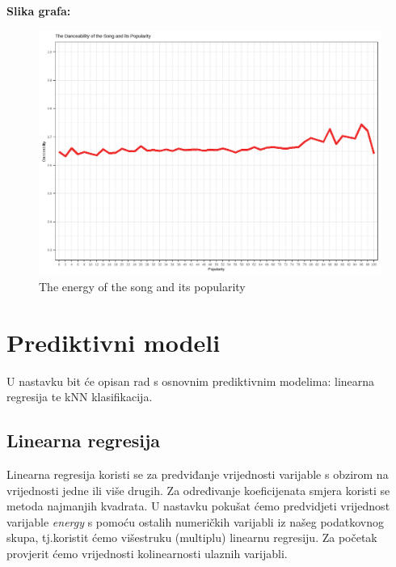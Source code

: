     
    \textbf{Slika grafa:}
    \begin{figure}[H]
    	\includegraphics[scale=0.9]{slike/danceability_popularity.png}
    	\centering
    	\caption{The energy of the song and its popularity}
    	
    \end{figure}
    
    

\clearpage
\section{Prediktivni modeli}

	U nastavku bit će opisan rad s osnovnim prediktivnim modelima: linearna regresija te kNN klasifikacija. 
	
	\subsection{Linearna regresija}
	
	Linearna regresija koristi se za predviđanje vrijednosti varijable s obzirom na vrijednosti jedne ili više drugih. Za određivanje koeficijenata smjera koristi se metoda najmanjih kvadrata. U nastavku pokušat ćemo predvidjeti vrijednost varijable \textit{energy} s pomoću ostalih numeričkih varijabli iz našeg podatkovnog skupa, tj.koristit ćemo višestruku (multiplu) linearnu regresiju.
	Za početak provjerit ćemo vrijednosti kolinearnosti ulaznih varijabli.
	
